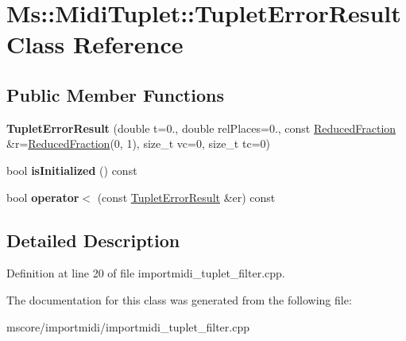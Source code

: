 \hypertarget{class_ms_1_1_midi_tuplet_1_1_tuplet_error_result}{}\section{Ms\+:\+:Midi\+Tuplet\+:\+:Tuplet\+Error\+Result Class Reference}
\label{class_ms_1_1_midi_tuplet_1_1_tuplet_error_result}
\subsection*{Public Member Functions}
\begin{DoxyCompactItemize}
\item 
\mbox{\label{class_ms_1_1_midi_tuplet_1_1_tuplet_error_result_a230fc677f9c757e4778f4a08346e1801}} 
{\bfseries Tuplet\+Error\+Result} (double t=0., double rel\+Places=0., const \hyperlink{class_ms_1_1_reduced_fraction}{Reduced\+Fraction} \&r=\hyperlink{class_ms_1_1_reduced_fraction}{Reduced\+Fraction}(0, 1), size\+\_\+t vc=0, size\+\_\+t tc=0)
\item 
\mbox{\label{class_ms_1_1_midi_tuplet_1_1_tuplet_error_result_a27b30580d0b3b6ad8dcc11bedcacb9e7}} 
bool {\bfseries is\+Initialized} () const
\item 
\mbox{\label{class_ms_1_1_midi_tuplet_1_1_tuplet_error_result_adcb02f212116b0bd7c14a225ab4fc438}} 
bool {\bfseries operator$<$} (const \hyperlink{class_ms_1_1_midi_tuplet_1_1_tuplet_error_result}{Tuplet\+Error\+Result} \&er) const
\end{DoxyCompactItemize}


\subsection{Detailed Description}


Definition at line 20 of file importmidi\+\_\+tuplet\+\_\+filter.\+cpp.



The documentation for this class was generated from the following file\+:\begin{DoxyCompactItemize}
\item 
mscore/importmidi/importmidi\+\_\+tuplet\+\_\+filter.\+cpp\end{DoxyCompactItemize}
